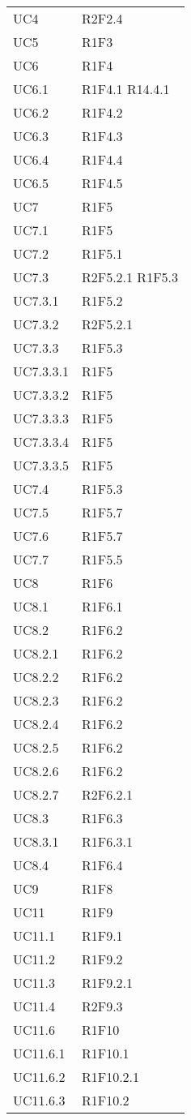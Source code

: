{\begin{longtable}{C{4cm} C{11.5cm}}
UC4 & R2F2.4 \\

UC5 & R1F3 \\

UC6 & R1F4 \\
UC6.1 & R1F4.1 \quad R14.4.1\\
UC6.2 & R1F4.2 \\
UC6.3 & R1F4.3 \\
UC6.4 & R1F4.4 \\
UC6.5 & R1F4.5 \\

UC7 & R1F5 \\
UC7.1 & R1F5 \\
UC7.2 & R1F5.1 \\
UC7.3 & R2F5.2.1  \quad R1F5.3\\
UC7.3.1 & R1F5.2 \\
UC7.3.2 & R2F5.2.1 \\
UC7.3.3 & R1F5.3 \\
UC7.3.3.1 & R1F5 \\
UC7.3.3.2 & R1F5 \\
UC7.3.3.3 & R1F5 \\
UC7.3.3.4 & R1F5 \\
UC7.3.3.5 & R1F5 \\
UC7.4 & R1F5.3 \\
UC7.5 & R1F5.7 \\
UC7.6 & R1F5.7 \\
UC7.7 & R1F5.5 \\

UC8 & R1F6 \\
UC8.1 & R1F6.1 \\
UC8.2 & R1F6.2 \\
UC8.2.1 & R1F6.2 \\
UC8.2.2 & R1F6.2 \\
UC8.2.3 & R1F6.2 \\
UC8.2.4 & R1F6.2 \\
UC8.2.5 & R1F6.2 \\
UC8.2.6 & R1F6.2 \\
UC8.2.7 & R2F6.2.1 \\
UC8.3 & R1F6.3 \\
UC8.3.1 & R1F6.3.1 \\
UC8.4 & R1F6.4 \\

UC9 & R1F8 \\

UC11 & R1F9 \\
UC11.1 & R1F9.1 \\
UC11.2 & R1F9.2 \\
UC11.3 & R1F9.2.1 \\
UC11.4 & R2F9.3 \\
UC11.6 & R1F10 \\
UC11.6.1 & R1F10.1 \\
UC11.6.2 & R1F10.2.1 \\
UC11.6.3 & R1F10.2 \\


\end{longtable}}
